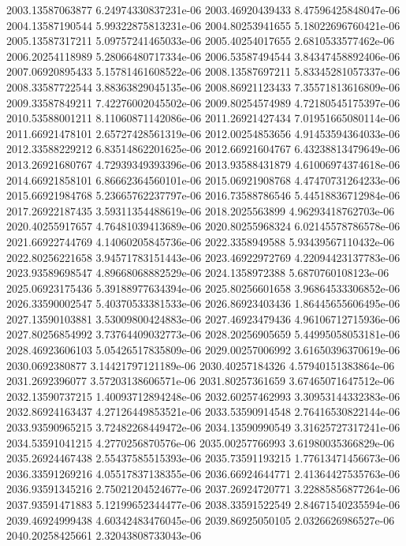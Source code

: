 {2003.13587063877 6.24974330837231e-06
2003.46920439433 8.47596425848047e-06
2004.13587190544 5.99322875813231e-06
2004.80253941655 5.18022696760421e-06
2005.13587317211 5.09757241465033e-06
2005.40254017655 2.6810533577462e-06
2006.20254118989 5.28066480717334e-06
2006.53587494544 3.84347458892406e-06
2007.06920895433 5.15781461608522e-06
2008.13587697211 5.83345281057337e-06
2008.33587722544 3.88363829045135e-06
2008.86921123433 7.35571813616809e-06
2009.33587849211 7.42276002045502e-06
2009.80254574989 4.72180545175397e-06
2010.53588001211 8.11060871142086e-06
2011.26921427434 7.01951665080114e-06
2011.66921478101 2.65727428561319e-06
2012.00254853656 4.91453594364033e-06
2012.33588229212 6.83514862201625e-06
2012.66921604767 6.43238813479649e-06
2013.26921680767 4.72939349393396e-06
2013.93588431879 4.61006974374618e-06
2014.66921858101 6.86662364560101e-06
2015.06921908768 4.47470731264233e-06
2015.66921984768 5.23665762237797e-06
2016.73588786546 5.44518836712984e-06
2017.26922187435 3.59311354488619e-06
2018.2025563899 4.96293418762703e-06
2020.40255917657 4.76481039413689e-06
2020.80255968324 6.02145578786578e-06
2021.66922744769 4.14060205845736e-06
2022.3358949588 5.93439567110432e-06
2022.80256221658 3.94571783151443e-06
2023.46922972769 4.22094423137783e-06
2023.93589698547 4.89668068882529e-06
2024.1358972388 5.6870760108123e-06
2025.06923175436 5.39188977634394e-06
2025.80256601658 3.96864533306852e-06
2026.33590002547 5.40370533381533e-06
2026.86923403436 1.86445655606495e-06
2027.13590103881 3.53009800424883e-06
2027.46923479436 4.96106712715936e-06
2027.80256854992 3.73764409032773e-06
2028.20256905659 5.44995058053181e-06
2028.46923606103 5.05426517835809e-06
2029.00257006992 3.61650396370619e-06
2030.0692380877 3.14421797121189e-06
2030.40257184326 4.57940151383864e-06
2031.2692396077 3.57203138606571e-06
2031.80257361659 3.67465071647512e-06
2032.13590737215 1.40093712894248e-06
2032.60257462993 3.30953144332383e-06
2032.86924163437 4.27126449853521e-06
2033.53590914548 2.76416530822144e-06
2033.93590965215 3.72482268449472e-06
2034.13590990549 3.31625727317241e-06
2034.53591041215 4.2770256870576e-06
2035.00257766993 3.61980035366829e-06
2035.26924467438 2.55437585515393e-06
2035.73591193215 1.77613471456673e-06
2036.33591269216 4.05517837138355e-06
2036.66924644771 2.41364427535763e-06
2036.93591345216 2.75021204524677e-06
2037.26924720771 3.22885856877264e-06
2037.93591471883 5.12199652344477e-06
2038.33591522549 2.84671540235594e-06
2039.46924999438 4.60342483476045e-06
2039.86925050105 2.0326626986527e-06
2040.20258425661 2.32043808733043e-06
}
